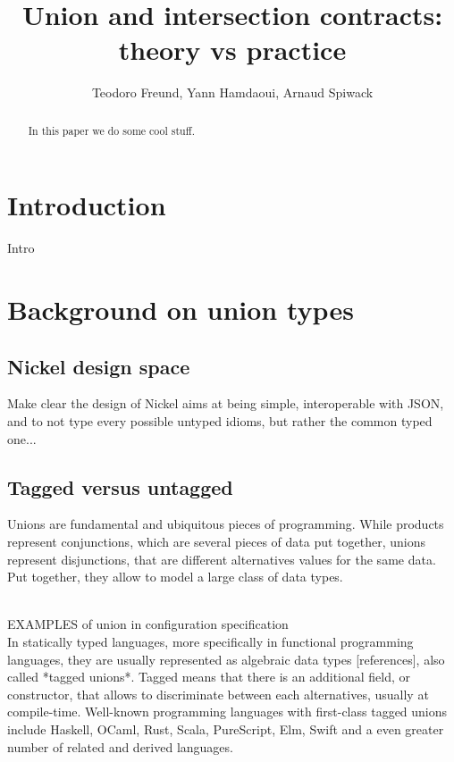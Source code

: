 \documentclass{article}
\title{Union and intersection contracts: theory vs practice}
\author{Teodoro Freund, Yann Hamdaoui, Arnaud Spiwack}
\begin{document}
\maketitle

\begin{abstract}
 In this paper we do some cool stuff.
\end{abstract}

\section*{Introduction}
Intro

\section{Background on union types}

\subsection{Nickel design space}

Make clear the design of Nickel aims at being simple, interoperable with JSON,
and to not type every possible untyped idioms, but rather the common typed one...

\subsection{Tagged versus untagged}

Unions are fundamental and ubiquitous pieces of programming. While products
represent conjunctions, which are several pieces of data put together, unions
represent disjunctions, that are different alternatives values for the same
data. Put together, they allow to model a large class of data types. 

\\
EXAMPLES of union in configuration specification
\\

In statically typed languages, more specifically in functional programming
languages, they are usually represented as algebraic data types [references],
also called *tagged unions*. Tagged means that there is an additional field, or
constructor, that allows to discriminate between each alternatives, usually at
compile-time. Well-known programming languages with first-class tagged unions
include Haskell, OCaml, Rust, Scala, PureScript, Elm, Swift and a even greater
number of related and derived languages.
\end{document}
